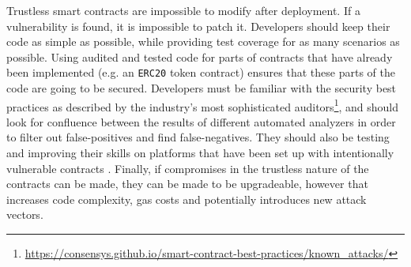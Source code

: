 Trustless smart contracts are impossible to modify after deployment. If a vulnerability is found, it is impossible to patch it. Developers should keep their code as simple as possible, while providing test coverage for as many scenarios as possible. Using audited and tested code for parts of contracts that have already been implemented (e.g. an \texttt{ERC20} token contract) ensures that these parts of the code are going to be secured. Developers must be familiar with the security best practices as described by the industry's most sophisticated auditors\footnote{\url{https://consensys.github.io/smart-contract-best-practices/known_attacks/}}, and should look for confluence between the results of different automated analyzers in order to filter out false-positives and find false-negatives. They should also be testing and improving their skills on platforms that have been set up with intentionally vulnerable contracts \cite{ethernaut, hackthiscontract, capturetheether}. Finally, if compromises in the trustless nature of the contracts can be made, they can be made to be upgradeable, however that increases code complexity, gas costs and potentially introduces new attack vectors.